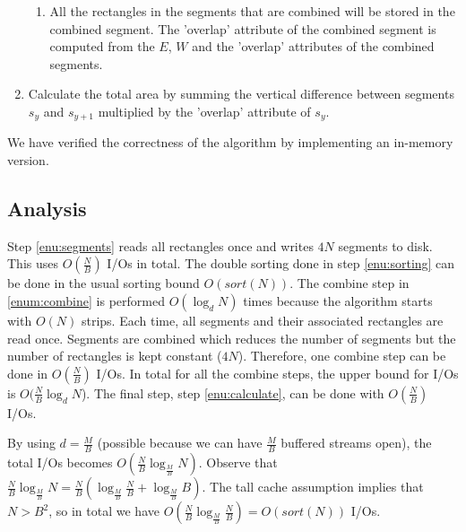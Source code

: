\begin{enumerate}
\begin{enumerate}
        \item All the rectangles in the segments that are combined will be stored in the combined segment. The 'overlap' attribute of the combined segment is computed from the $E$, $W$ and the 'overlap' attributes of the combined segments.
    \end{enumerate}
\item \label{enu:calculate} Calculate the total area by summing the vertical difference between segments $s_{y}$ and $s_{y+1}$ multiplied by the 'overlap' attribute of $s_{y}$.
\end{enumerate}

We have verified the correctness of the algorithm by implementing an in-memory version.

\subsection{Analysis}

Step \ref{enu:segments} reads all rectangles once and writes $4N$ segments to disk. This uses $O(\frac{N}{B})$ I/Os in total. The double sorting done in step \ref{enu:sorting} can be done in the usual sorting bound $O(sort(N))$. The combine step in \ref{enum:combine} is performed $O(\log_{d}{N})$ times because the algorithm starts with $O(N)$ strips. Each time, all segments and their associated rectangles are read once. Segments are combined which reduces the number of segments but the number of rectangles is kept constant ($4N$). Therefore, one combine step can be done in $O(\frac{N}{B})$ I/Os. In total for all the combine steps, the upper bound for I/Os is $O(\frac{N}{B}\log_{d}{N}$). The final step, step \ref{enu:calculate}, can be done with $O(\frac{N}{B})$ I/Os.

By using $d = \frac{M}{B}$ (possible because we can have $\frac{M}{B}$ buffered streams open), the total I/Os becomes $O(\frac{N}{B}\log_{\frac{M}{B}}{N})$. Observe that $\frac{N}{B}\log_{\frac{M}{B}}{N}=\frac{N}{B}(\log_{\frac{M}{B}}{\frac{N}{B}}+\log_{\frac{M}{B}}{B})$. The tall cache assumption implies that $N>B^2$, so in total we have $O(\frac{N}{B}\log_{\frac{M}{B}}{\frac{N}{B}})=O(sort(N))$ I/Os.

